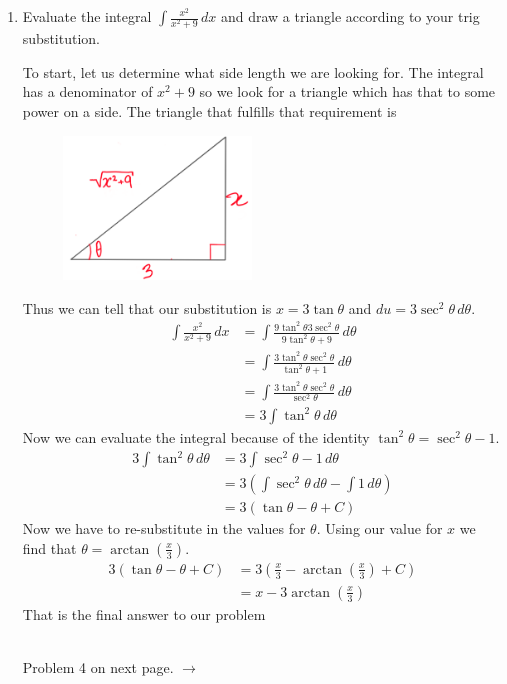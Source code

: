 \documentclass{article}
\begin{document}
\begin{enumerate}[label=\textbf{(5.\arabic*)}]

\newpage


\item Evaluate the integral $\displaystyle{\int\!\frac{x^2}{x^2+9}\,dx}$ and draw a triangle according to your trig substitution.

To start, let us determine what side length we are looking for. The integral has a denominator of $x^2+9$ so we look for a triangle which has that to some power on a side. The triangle that fulfills that requirement is
\begin{figure}[H]
    \centering
    \includegraphics[width=5cm]{sines}
\end{figure}
Thus we can tell that our substitution is $x=3\tan\theta$ and $du=3\sec^2\theta\,d\theta$.
\begin{align*}
\int\!\frac{x^2}{x^2+9}\,dx &= \int\!\frac{9\tan^2\theta3\sec^2\theta}{9\tan^2\theta+9}\,d\theta \\
&= \int\!\frac{3\tan^2\theta\sec^2\theta}{\tan^2\theta+1}\,d\theta \\
&= \int\!\frac{3\tan^2\theta\sec^2\theta}{\sec^2\theta}\,d\theta \\
&= 3\int\!\tan^2\theta\,d\theta
\end{align*}
Now we can evaluate the integral because of the identity $\tan^2\theta=\sec^2\theta-1$.
\begin{align*}
    3\int\!\tan^2\theta\,d\theta&=3\int\!\sec^2\theta-1\,d\theta \\
    &=3\left(\int\!\sec^2\theta\,d\theta-\int\!1\,d\theta\right) \\
    &=3\left(\tan\theta-\theta+C\right)
\end{align*}
Now we have to re-substitute in the values for $\theta$. Using our value for $x$ we find that $\theta=\arctan\left(\frac{x}{3}\right)$.
\begin{align*}
    3\left(\tan\theta-\theta+C\right) &= 3\left(\frac{x}{3}-\arctan\left(\frac{x}{3}\right)+C \right) \\
    &= x-3\arctan\left(\frac{x}{3}\right)
\end{align*}
That is the final answer to our problem
\begin{center}
     \\
    \vspace{1 in}
    Problem 4 on next page. $\rightarrow$
\end{center}


\end{enumerate}
\end{document}
